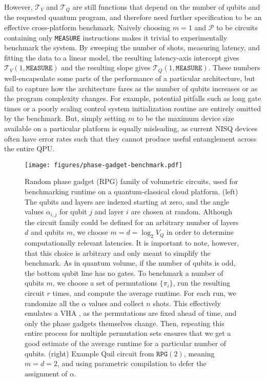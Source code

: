 \documentclass[12pt]{iopart}
\begin{document}
However, $\mathcal{T}_V$ and $\mathcal{T}_Q$ are still functions that depend on the number of qubits and the requested quantum program, and therefore need further specification to be an effective cross-platform benchmark. Naively choosing $m = 1$ and $\mathcal{P}$ to be circuits containing only \texttt{MEASURE} instructions makes it trivial to experimentally benchmark the system. By sweeping the number of shots, measuring latency, and fitting the data to a linear model, the resulting latency-axis intercept gives $\mathcal{T}_V(1, \texttt{MEASURE})$ and the resulting slope gives $\mathcal{T}_Q(1,\texttt{MEASURE})$. These numbers well-encapsulate some parts of the performance of a particular architecture, but fail to capture how the architecture fares as the number of qubits increases or as the program complexity changes. For example, potential pitfalls such as long gate times or a poorly scaling control system initialization routine are entirely omitted by the benchmark. But, simply setting $m$ to be the maximum device size available on a particular platform is equally misleading, as current NISQ devices often have error rates such that they cannot produce useful entanglement across the entire QPU.

\begin{figure}
    \centering
    \texttt{[image: figures/phase-gadget-benchmark.pdf]}
    \caption{
    Random phase gadget (RPG) family of volumetric circuits, used for benchmarking runtime on a quantum-classical cloud platform. (left) The qubits and layers are indexed starting at zero, and the angle values $\alpha_{i,j}$ for qubit $j$ and layer $i$ are chosen at random. Although the circuit family could be defined for an arbitrary number of layers $d$ and qubits $m$, we choose $m = d = \log_{2}{V_Q}$ in order to determine computationally relevant latencies. It is important to note, however, that this choice is arbitrary and only meant to simplify the benchmark. As in quantum volume, if the number of qubits is odd, the bottom qubit line has no gates. To benchmark a number of qubits $m$, we choose a set of permutations $\{\pi_i\}$, run the resulting circuit $r$ times, and compute the average runtime. For each run, we randomize all the $\alpha$ values and collect $n$ shots. This effectively emulates a VHA \cite{CrooksQAOA}, as the permutations are fixed ahead of time, and only the phase gadgets themselves change. Then, repeating this entire process for multiple permutation sets ensures that we get a good estimate of the average runtime for a particular number of qubits.  (right) Example Quil circuit from $\texttt{RPG}(2)$, meaning $m = d = 2$, and using parametric compilation to defer the assignment of $\alpha$.}
    \label{fig:Phase-Gadget}
\end{figure}
\end{document}
